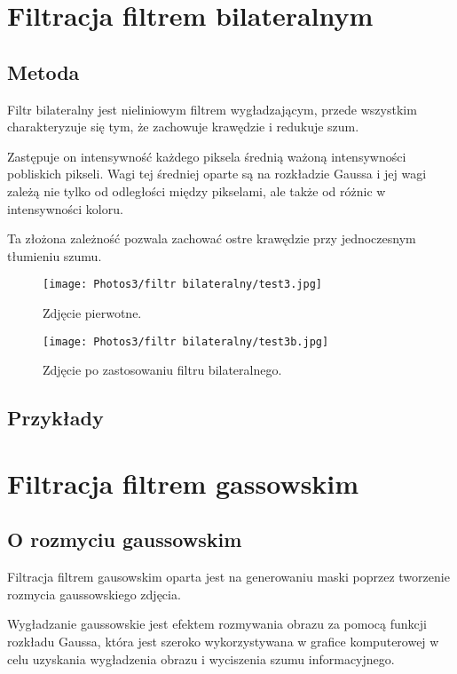 \documentclass[]{mwart}
\begin{document}
\section{Filtracja filtrem bilateralnym         }
\subsection{Metoda}
Filtr bilateralny jest nieliniowym filtrem wygładzającym, przede wszystkim charakteryzuje się tym,
że zachowuje krawędzie i redukuje szum.

Zastępuje on intensywność każdego
piksela średnią ważoną intensywności pobliskich pikseli.
Wagi tej średniej oparte są na rozkładzie Gaussa i jej wagi zależą nie tylko od odległości
między pikselami, ale także od różnic w intensywności koloru.

Ta złożona zależność pozwala zachować ostre krawędzie przy jednoczesnym tłumieniu szumu.

\begin{figure}[H]
    \centering
    \texttt{[image: Photos3/filtr bilateralny/test3.jpg]}
    \caption{Zdjęcie pierwotne.}
\end{figure}
\begin{figure}[H]
    \centering
    \texttt{[image: Photos3/filtr bilateralny/test3b.jpg]}
    \caption{Zdjęcie po zastosowaniu filtru bilateralnego.}
\end{figure}



\subsection{Przykłady}



\section{Filtracja filtrem gassowskim           }
\subsection{O rozmyciu gaussowskim}
Filtracja filtrem gausowskim oparta jest na generowaniu maski poprzez tworzenie rozmycia gaussowskiego zdjęcia.

Wygładzanie gaussowskie jest efektem rozmywania obrazu za pomocą funkcji rozkładu Gaussa,
która jest szeroko wykorzystywana w grafice komputerowej w celu uzyskania wygładzenia obrazu i wyciszenia szumu informacyjnego.
\end{document}
